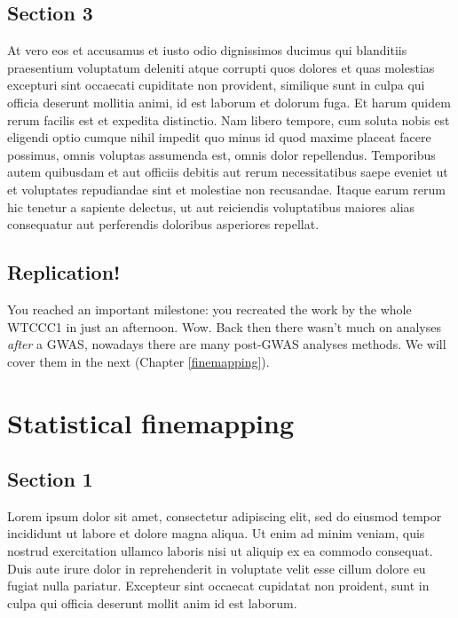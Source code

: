 \documentclass[
]{book}
\begin{document}
\hypertarget{section-3}{%
\section{Section 3}\label{section-3}}

At vero eos et accusamus et iusto odio dignissimos ducimus qui blanditiis praesentium voluptatum deleniti atque corrupti quos dolores et quas molestias excepturi sint occaecati cupiditate non provident, similique sunt in culpa qui officia deserunt mollitia animi, id est laborum et dolorum fuga. Et harum quidem rerum facilis est et expedita distinctio. Nam libero tempore, cum soluta nobis est eligendi optio cumque nihil impedit quo minus id quod maxime placeat facere possimus, omnis voluptas assumenda est, omnis dolor repellendus. Temporibus autem quibusdam et aut officiis debitis aut rerum necessitatibus saepe eveniet ut et voluptates repudiandae sint et molestiae non recusandae. Itaque earum rerum hic tenetur a sapiente delectus, ut aut reiciendis voluptatibus maiores alias consequatur aut perferendis doloribus asperiores repellat.

\hypertarget{replication-2}{%
\section{Replication!}\label{replication-2}}

You reached an important milestone: you recreated the work by the whole WTCCC1 in just an afternoon. Wow. Back then there wasn't much on analyses \emph{after} a GWAS, nowadays there are many post-GWAS analyses methods. We will cover them in the next (Chapter \ref{finemapping}).

\hypertarget{statistical-finemapping}{%
\chapter{Statistical finemapping}\label{statistical-finemapping}}

\hypertarget{section-1-1}{%
\section{Section 1}\label{section-1-1}}

Lorem ipsum dolor sit amet, consectetur adipiscing elit, sed do eiusmod tempor incididunt ut labore et dolore magna aliqua. Ut enim ad minim veniam, quis nostrud exercitation ullamco laboris nisi ut aliquip ex ea commodo consequat. Duis aute irure dolor in reprehenderit in voluptate velit esse cillum dolore eu fugiat nulla pariatur. Excepteur sint occaecat cupidatat non proident, sunt in culpa qui officia deserunt mollit anim id est laborum.
\end{document}
